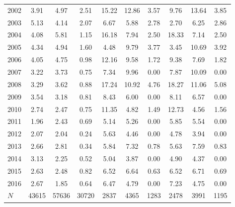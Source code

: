 \begin{table}[htbp]
\begin{tabular}{l*{9}{c}}
2002      &     3.91&     4.97&     2.51&    15.22&    12.86&     3.57&     9.76&    13.64&     3.85\\
2003      &     5.13&     4.14&     2.07&     6.67&     5.88&     2.78&     2.70&     6.25&     2.86\\
2004      &     4.08&     5.81&     1.15&    16.18&     7.94&     2.50&    18.33&     7.14&     2.50\\
2005      &     4.34&     4.94&     1.60&     4.48&     9.79&     3.77&     3.45&    10.69&     3.92\\
2006      &     4.05&     4.75&     0.98&    12.16&     9.58&     1.72&     9.38&     7.69&     1.82\\
2007      &     3.22&     3.73&     0.75&     7.34&     9.96&     0.00&     7.87&    10.09&     0.00\\
2008      &     3.29&     3.62&     0.88&    17.24&    10.92&     4.76&    18.27&    11.06&     5.08\\
2009      &     3.54&     3.18&     0.81&     8.43&     6.00&     0.00&     8.11&     6.57&     0.00\\
2010      &     2.74&     2.47&     0.75&    11.35&     4.82&     1.49&    12.73&     4.56&     1.56\\
2011      &     1.96&     2.43&     0.69&     5.14&     5.26&     0.00&     5.85&     5.54&     0.00\\
2012      &     2.07&     2.04&     0.24&     5.63&     4.46&     0.00&     4.78&     3.94&     0.00\\
2013      &     2.66&     2.81&     0.34&     5.84&     7.32&     0.78&     5.63&     7.59&     0.83\\
2014      &     3.13&     2.25&     0.52&     5.04&     3.87&     0.00&     4.90&     4.37&     0.00\\
2015      &     2.63&     2.48&     0.82&     6.52&     6.64&     0.63&     6.52&     6.71&     0.69\\
2016      &     2.67&     1.85&     0.64&     6.47&     4.79&     0.00&     7.23&     4.75&     0.00\\
\hline
\(N\)     &    43615&    57636&    30720&     2837&     4365&     1283&     2478&     3991&     1195\\
\hline\hline
\end{tabular}
\end{table}
